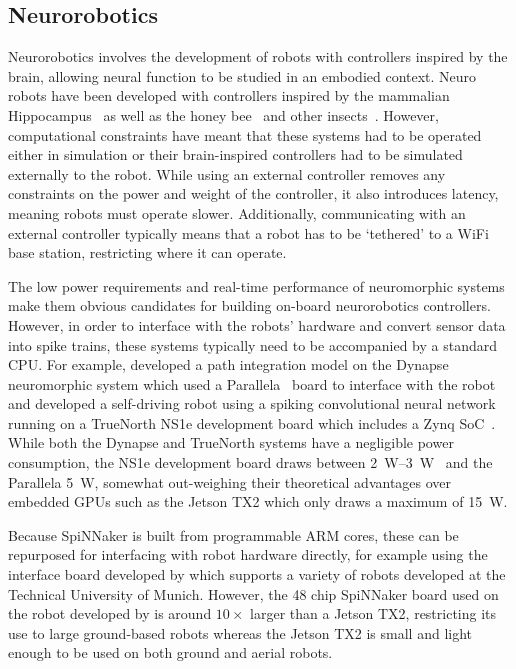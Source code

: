 \documentclass[utf8]{frontiersSCNS} %
\begin{document}
\subsection{Neurorobotics}
\label{sec:discussion/neurobotics}
Neurorobotics involves the development of robots with controllers inspired by the brain, allowing neural function to be studied in an embodied context.
Neuro robots have been developed with controllers inspired by the mammalian Hippocampus~\citep{Krichmar2005} as well as the honey bee~\citep{Cope2016} and other insects~\citep{Blanchard2000}.
However, computational constraints have meant that these systems had to be operated either in simulation or their brain-inspired controllers had to be simulated externally to the robot.
While using an external controller removes any constraints on the power and weight of the controller, it also introduces latency, meaning robots must operate slower.
Additionally, communicating with an external controller typically means that a robot has to be `tethered' to a WiFi base station, restricting where it can operate.

The low power requirements and real-time performance of neuromorphic systems make them obvious candidates for building on-board neurorobotics controllers.
However, in order to interface with the robots' hardware and convert sensor data into spike trains, these systems typically need to be accompanied by a standard CPU.
For example, \citet{Kreiser2018} developed a path integration model on the Dynapse~\citep{Qiao2015} neuromorphic system which used a Parallela~\citep{Olofsson2015} board to interface with the robot and \citet{Hwu2017} developed a self-driving robot using a spiking convolutional neural network running on a TrueNorth NS1e development board which includes a Zynq SoC~\citep{XilinxInc2018}.
While both the Dynapse and TrueNorth systems have a negligible power consumption, the NS1e development board draws between \SIrange{2}{3}{\watt}~\citep{Sawada2016} and the Parallela \SI{5}{\watt}, somewhat out-weighing their theoretical advantages over embedded GPUs such as the Jetson TX2 which only draws a maximum of \SI{15}{\watt}.

Because SpiNNaker is built from programmable ARM cores, these can be repurposed for interfacing with robot hardware directly, for example using the interface board developed by \citet{Denk2013} which supports a variety of robots developed at the Technical University of Munich.
However, the 48 chip SpiNNaker board used on the robot developed by \citet{Conradt2015} is around $10\times$ larger than a Jetson TX2, restricting its use to large ground-based robots whereas the Jetson TX2 is small and light enough to be used on both ground and aerial robots.
\end{document}
